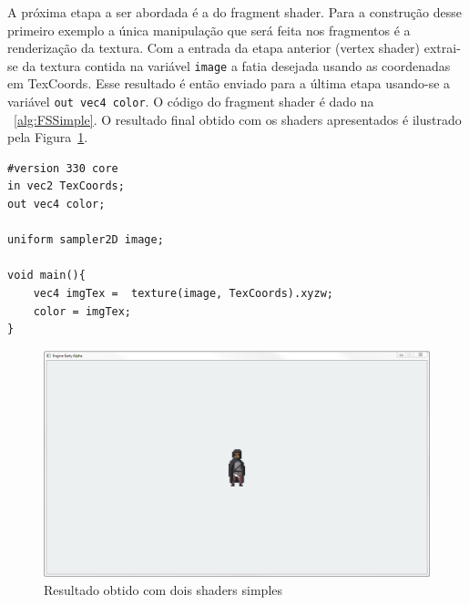 \documentclass[12pt, 
openright, 
oneside, 
a4paper,    
brazil]{facom-ufu-abntex2}
\begin{document}
A próxima etapa a ser abordada é a do fragment shader. Para a construção desse primeiro exemplo a única manipulação que será feita nos fragmentos é a renderização da textura. Com a entrada da etapa anterior (vertex shader) extrai-se da textura contida na variável \texttt{image} a fatia desejada usando as coordenadas em TexCoords. Esse resultado é então enviado para a última etapa usando-se a variável \texttt{out vec4 color}. O código do fragment shader é dado na \lstlistingname~\ref{alg:FSSimple}.
O resultado final obtido com os shaders apresentados é ilustrado pela Figura~\ref{fig:resultingImgShader}.

 \begin{lstlisting}[caption=Fragment shader simples, label={alg:FSSimple}]
#version 330 core
in vec2 TexCoords;
out vec4 color;

uniform sampler2D image;

void main(){
	vec4 imgTex =  texture(image, TexCoords).xyzw;
	color = imgTex;
}
\end{lstlisting}

\begin{figure}[H]
	\centering
	\includegraphics[width=\textwidth]{imagens/helloShader.png}
	\caption{Resultado obtido com dois shaders simples}
	\label{fig:resultingImgShader}
\end{figure}
\end{document}
